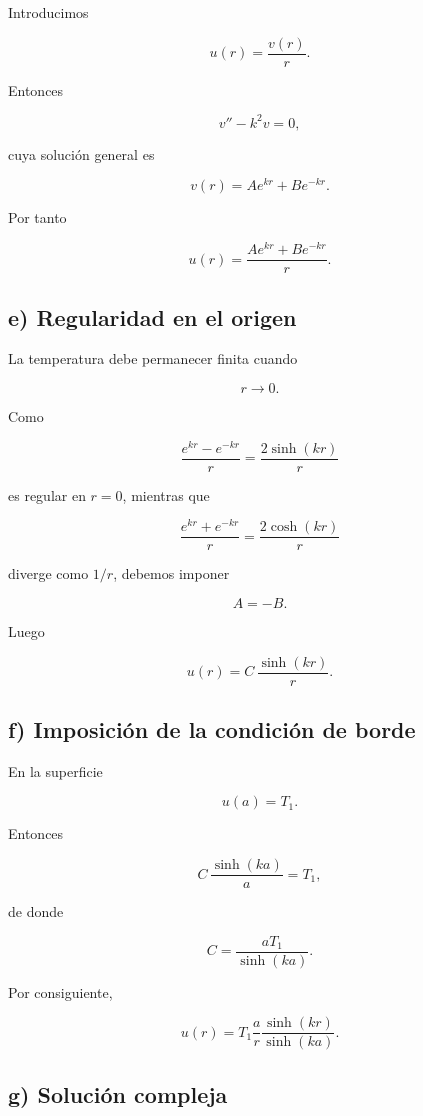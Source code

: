 \documentclass[11pt,spanish]{article}
\begin{document}
Introducimos

\[
u(r)=\frac{v(r)}{r}.
\]

Entonces

\[
v''-k^2v=0,
\]

cuya solución general es

\[
v(r)=Ae^{kr}+Be^{-kr}.
\]

Por tanto

\[
u(r)
=
\frac{Ae^{kr}+Be^{-kr}}{r}.
\]


\subsection*{e) Regularidad en el origen}

La temperatura debe permanecer finita cuando

\[
r\to0.
\]

Como

\[
\frac{e^{kr}-e^{-kr}}{r}
=
\frac{2\sinh(kr)}{r}
\]

es regular en \(r=0\), mientras que

\[
\frac{e^{kr}+e^{-kr}}{r}
=
\frac{2\cosh(kr)}{r}
\]

diverge como \(1/r\), debemos imponer

\[
A=-B.
\]

Luego

\[
u(r)
=
C\,
\frac{\sinh(kr)}{r}.
\]


\subsection*{f) Imposición de la condición de borde}

En la superficie

\[
u(a)=T_1.
\]

Entonces

\[
C\,
\frac{\sinh(ka)}{a}
=
T_1,
\]

de donde

\[
C=
\frac{aT_1}{\sinh(ka)}.
\]

Por consiguiente,

\[
\boxed{
u(r)
=
T_1
\frac{a}{r}
\frac{\sinh(kr)}
{\sinh(ka)}.
}
\]


\subsection*{g) Solución compleja}
\end{document}
